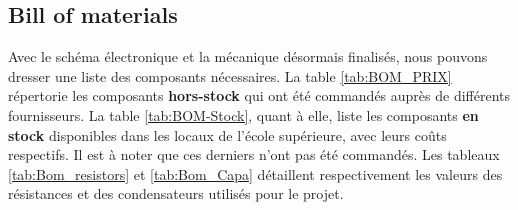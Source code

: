 \clearpage

\subsection{Bill of materials} \label{ssec:BOM}
Avec le schéma électronique et la mécanique désormais finalisés, nous pouvons dresser une liste des composants nécessaires. La table \ref{tab:BOM_PRIX} répertorie les composants \textbf{hors-stock} qui ont été commandés auprès de différents fournisseurs. La table \ref{tab:BOM-Stock}, quant à elle, liste les composants \textbf{en stock} disponibles dans les locaux de l'école supérieure, avec leurs coûts respectifs. Il est à noter que ces derniers n'ont pas été commandés. Les tableaux \ref{tab:Bom_resistors} et \ref{tab:Bom_Capa} détaillent respectivement les valeurs des résistances et des condensateurs utilisés pour le projet.

